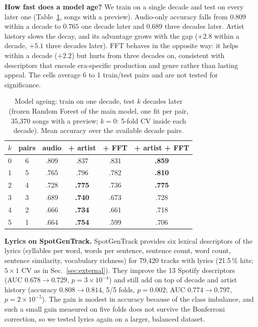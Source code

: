 \textbf{How fast does a model age?} We train on a single decade and test on every later
one (Table~\ref{tab:decay}, songs with a preview). Audio-only accuracy falls from
$0.809$ within a decade to $0.765$ one decade later and $0.689$ three decades later.
Artist history slows the decay, and its advantage grows with the gap ($+2.8$\pp{} within
a decade, $+5.1$\pp{} three decades later). FFT behaves in the opposite way: it helps
within a decade ($+2.2$\pp) but hurts from three decades on, consistent with descriptors
that encode era-specific production and genre rather than lasting appeal. The cells
average 6 to 1 train/test pairs and are not tested for significance.

\begin{table}[!htbp]
\centering
\caption{Model ageing: train on one decade, test $k$ decades later (frozen Random Forest of the main model, one fit
per pair,
35{,}370 songs with a preview; $k=0$: 5-fold CV inside each decade). Mean accuracy over
the available decade pairs.}
\label{tab:decay}
\setlength{\tabcolsep}{4pt}
\begin{tabular}{cccccc}
\toprule
$k$ & pairs & audio & + artist & + FFT & + artist + FFT \\
\midrule
0 & 6 & .809 & .837 & .831 & \textbf{.859} \\
1 & 5 & .765 & .796 & .782 & \textbf{.810} \\
2 & 4 & .728 & \textbf{.775} & .736 & \textbf{.775} \\
3 & 3 & .689 & \textbf{.740} & .673 & .728 \\
4 & 2 & .666 & \textbf{.734} & .661 & .718 \\
5 & 1 & .664 & \textbf{.754} & .599 & .706 \\
\bottomrule
\end{tabular}
\end{table}

\textbf{Lyrics on SpotGenTrack.} SpotGenTrack provides six lexical descriptors of the lyrics (syllables
per word, words per sentence, sentence count, word count, sentence similarity,
vocabulary richness) for 79{,}420 tracks with lyrics (21.5\,\% hits; $5{\times}1$ CV as in
Sec.~\ref{sec:external}). They improve the 13 Spotify descriptors (AUC $0.678\to0.729$,
$p=3\times10^{-4}$) and still add on top of decade and artist history (accuracy
$0.808\to0.814$, 5/5 folds, $p=0.002$; AUC $0.774\to0.797$, $p=2\times10^{-5}$). The gain
is modest in accuracy because of the class imbalance, and such a small gain measured on five folds does not
survive the Bonferroni correction, so we tested lyrics again on a larger, balanced dataset.


